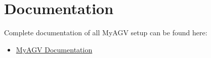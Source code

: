 \section{Documentation}

Complete documentation of all MyAGV setup can be found here:
\begin{itemize}
    \item \href{https://docs.elephantrobotics.com/docs/gitbook-en/2-serialproduct/2.5-myAGV.html}{MyAGV Documentation}
\end{itemize}

